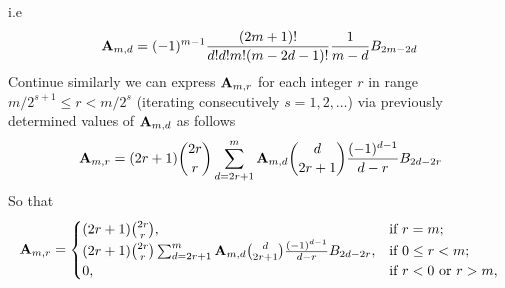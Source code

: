 i.e
\begin{equation*}
    {\mathbf{A}} \sb{m,d} = (-1)^{m-1} \frac{(2m+1)!}{d!d!m!(m-2d-1)!} \frac{1}{m-d} {B}\sb{2m-2d}
\end{equation*}
Continue similarly we can express ${\mathbf{A}} \sb{m,r}$ for each integer $r$ in range $m/2^{s+1}\leq r < m/2^s$
(iterating consecutively $s=1,2,\ldots$) via previously determined values of ${\mathbf{A}} \sb{m,d}$ as follows
\begin{equation*}
    {\mathbf{A}} \sb{m,r} =
    (2r+1) \binom{2r}{r} \sum_{d=2r+1}^{m} {\mathbf{A}} \sb{m,d} \binom{d}{2r+1} \frac{(-1)^{d-1}}{d-r}
    {B}\sb{2d-2r}
\end{equation*}
So that
\begin{align*}
    {\mathbf{A}} \sb{m,r} =
    \begin{cases}
    (2r+1)
        \binom{2r}{r}, & \text{if } r=m; \\
        (2r+1) \binom{2r}{r} \sum_{d=2r+1}^{m} {\mathbf{A}} \sb{m,d} \binom{d}{2r+1} \frac{(-1)^{d-1}}{d-r}
        {B}\sb{2d-2r}, & \text{if } 0 \leq r<m; \\
        0, & \text{if } r<0 \text{ or } r>m,
    \end{cases}
\end{align*}
